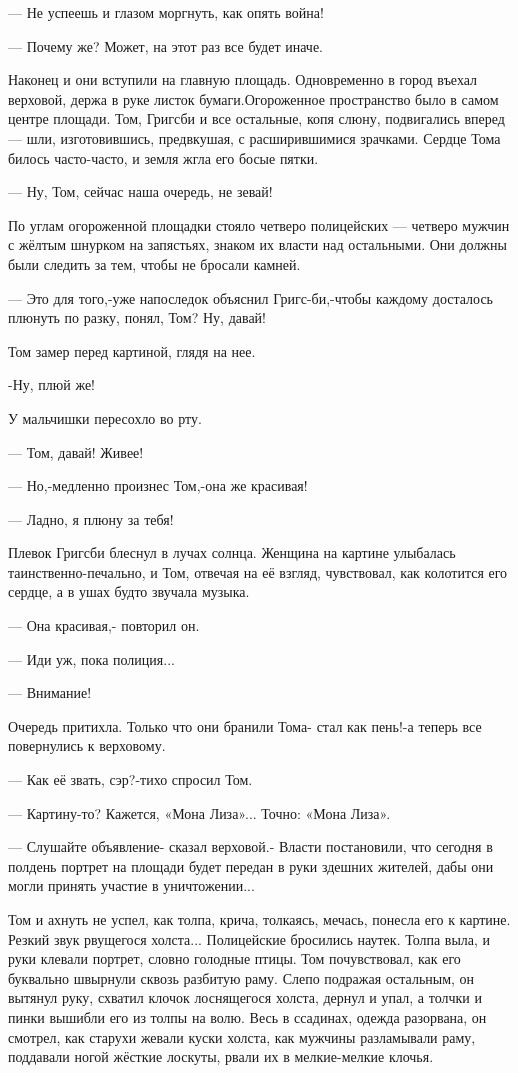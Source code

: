 — Не успеешь и глазом моргнуть, как опять война!

— Почему же? Может, на этот раз все будет иначе.

Наконец и они вступили на главную площадь. Одновременно в город въехал
верховой, держа в руке листок бумаги.Огороженное пространство было в самом
центре площади. Том, Григсби и все остальные, копя слюну, подвигались вперед —
шли, изготовившись, предвкушая, с расширившимися зрачками. Сердце Тома билось
часто-часто, и земля жгла его босые пятки.

— Ну, Том, сейчас наша очередь, не зевай!

По углам огороженной площадки стояло четверо полицейских — четверо мужчин с
жёлтым шнурком на запястьях, знаком их власти над остальными. Они должны были
следить за тем, чтобы не бросали камней.

— Это для того,-уже напоследок объяснил Григс-би,-чтобы каждому досталось
плюнуть по разку, понял, Том? Ну, давай!

Том замер перед картиной, глядя на нее.

-Ну, плюй же!

У мальчишки пересохло во рту.

— Том, давай! Живее!

— Но,-медленно произнес Том,-она же красивая!

— Ладно, я плюну за тебя!

Плевок Григсби блеснул в лучах солнца. Женщина на картине улыбалась
таинственно-печально, и Том, отвечая на её взгляд, чувствовал, как колотится
его сердце, а в ушах будто звучала музыка.

— Она красивая,- повторил он.

— Иди уж, пока полиция...

— Внимание!

Очередь притихла. Только что они бранили Тома- стал как пень!-а теперь все
повернулись к верховому.

— Как её звать, сэр?-тихо спросил Том.

— Картину-то? Кажется, «Мона Лиза»... Точно: «Мона Лиза».

— Слушайте объявление- сказал верховой.- Власти постановили, что сегодня в
полдень портрет на площади будет передан в руки здешних жителей, дабы они могли
принять участие в уничтожении...

Том и ахнуть не успел, как толпа, крича, толкаясь, мечась, понесла его к
картине. Резкий звук рвущегося холста... Полицейские бросились наутек. Толпа
выла, и руки клевали портрет, словно голодные птицы. Том почувствовал, как его
буквально швырнули сквозь разбитую раму. Слепо подражая остальным, он вытянул
руку, схватил клочок лоснящегося холста, дернул и упал, а толчки и пинки
вышибли его из толпы на волю. Весь в ссадинах, одежда разорвана, он смотрел,
как старухи жевали куски холста, как мужчины разламывали раму, поддавали ногой
жёсткие лоскуты, рвали их в мелкие-мелкие клочья.

